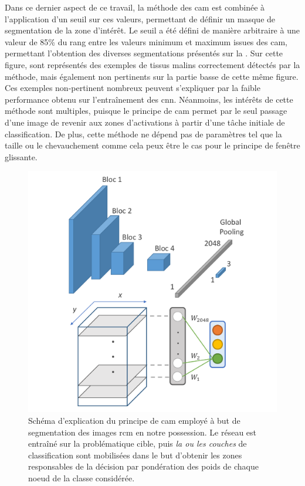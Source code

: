 Dans ce dernier aspect de ce travail, la méthode des \gls{cam} est combinée à l'application d'un seuil sur ces valeurs, permettant de définir un masque de segmentation de la zone d'intérêt. Le seuil a été défini de manière arbitraire à une valeur de 85\% du rang entre les valeurs minimum et maximum issues des \gls{cam}, permettant l'obtention des diverses segmentations présentés sur la . Sur cette figure, sont représentés des exemples de tissus malins correctement détectés par la méthode, mais également non pertinents sur la partie basse de cette même figure. Ces exemples non-pertinent nombreux peuvent s'expliquer par la faible performance obtenu sur l'entraînement des \gls{cnn}. Néanmoins, les intérêts de cette méthode sont multiples, puisque le principe de \gls{cam} permet par le seul passage d'une image de revenir aux zones d'activations à partir d'une tâche initiale de classification. De plus, cette méthode ne dépend pas de paramètres tel que la taille ou le chevauchement comme cela peux être le cas pour le principe de fenêtre glissante.\par

\begin{figure}[H]
    \centering
    \includegraphics[width=\linewidth]{contents/chapter_6/resources/scheme_image_improvement_cam.pdf}
    \caption{Schéma d'explication du principe de \gls{cam} employé à but de segmentation des images \gls{rcm} en notre possession. Le réseau est entraîné sur la problématique cible, puis \textit{la ou les couches} de classification sont mobilisées dans le but d'obtenir les zones responsables de la décision par pondération des poids de chaque noeud de la classe considérée.}
    \label{fig:scheme_image_improvement_cam}
\end{figure}\par

